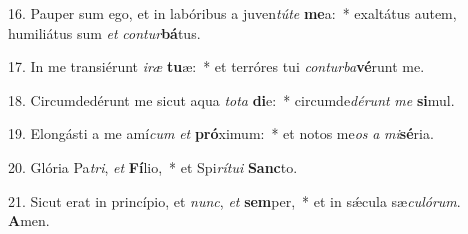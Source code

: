 16. Pauper sum ego, et in labóribus a juven\textit{tú}\textit{te} \textbf{me}a:~*  exaltátus autem, humiliátus sum \textit{et} \textit{con}\textit{tur}\textbf{bá}tus.\

17. In me transiérunt \textit{i}\textit{ræ} \textbf{tu}æ:~*  et terróres tui \textit{con}\textit{tur}\textit{ba}\textbf{vé}runt me.\

18. Circumdedérunt me sicut aqua \textit{to}\textit{ta} \textbf{di}e:~*  circumde\textit{dé}\textit{runt} \textit{me} \textbf{si}mul.\

19. Elongásti a me amí\textit{cum} \textit{et} \textbf{pró}ximum:~*  et notos me\textit{os} \textit{a} \textit{mi}\textbf{sé}ria.\

20. Glória Pa\textit{tri}, \textit{et} \textbf{Fí}lio,~*  et Spi\textit{rí}\textit{tu}\textit{i} \textbf{Sanc}to.\

21. Sicut erat in princípio, et \textit{nunc}, \textit{et} \textbf{sem}per,~*  et in sǽcula sæ\textit{cu}\textit{ló}\textit{rum}. \textbf{A}men.\

